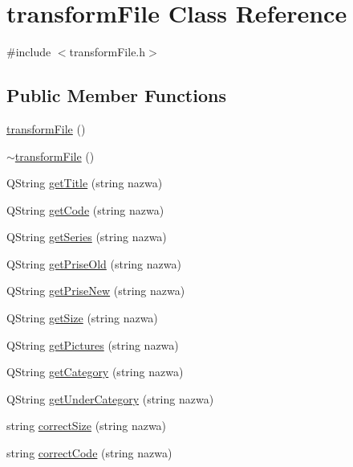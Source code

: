 \hypertarget{classtransform_file}{}\section{transform\+File Class Reference}
\label{classtransform_file}


{\ttfamily \#include $<$transform\+File.\+h$>$}

\subsection*{Public Member Functions}
\begin{DoxyCompactItemize}
\item 
\mbox{\hyperlink{classtransform_file_a3c30c0beee695f0734ab360522fdba5c}{transform\+File}} ()
\item 
\mbox{\hyperlink{classtransform_file_af012d67d96337385c20585da0789f6e9}{$\sim$transform\+File}} ()
\item 
Q\+String \mbox{\hyperlink{classtransform_file_a1cf42c937c6e8c0aae38cee401a5ac26}{get\+Title}} (string nazwa)
\item 
Q\+String \mbox{\hyperlink{classtransform_file_aa8019a9e13e288f647d85d829f6da6f0}{get\+Code}} (string nazwa)
\item 
Q\+String \mbox{\hyperlink{classtransform_file_a2fca59437a40a6ab684a40f9837b4b1d}{get\+Series}} (string nazwa)
\item 
Q\+String \mbox{\hyperlink{classtransform_file_af3a59c4dc958a01a50378ea98b13c468}{get\+Prise\+Old}} (string nazwa)
\item 
Q\+String \mbox{\hyperlink{classtransform_file_aa951d2ed03ccc544b804c623fc01c3b2}{get\+Prise\+New}} (string nazwa)
\item 
Q\+String \mbox{\hyperlink{classtransform_file_a3f269bcc17e3c778d252a387424672af}{get\+Size}} (string nazwa)
\item 
Q\+String \mbox{\hyperlink{classtransform_file_a1c549e0ca2420d023a507512cc97b8c3}{get\+Pictures}} (string nazwa)
\item 
Q\+String \mbox{\hyperlink{classtransform_file_ac5863226a17c784e7178bdc1607b0fcb}{get\+Category}} (string nazwa)
\item 
Q\+String \mbox{\hyperlink{classtransform_file_a9c79f12406e77ce0595f8fb587813d28}{get\+Under\+Category}} (string nazwa)
\item 
string \mbox{\hyperlink{classtransform_file_a9f1b11361f9025107f1605c9d58387df}{correct\+Size}} (string nazwa)
\item 
string \mbox{\hyperlink{classtransform_file_a3aa75a96c0b8ac1b1355cbce80218b2b}{correct\+Code}} (string nazwa)
\end{DoxyCompactItemize}


